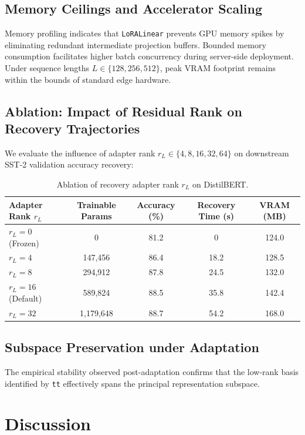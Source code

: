 \subsection{Memory Ceilings and Accelerator Scaling}
Memory profiling indicates that \texttt{LoRALinear} prevents GPU memory spikes by eliminating redundant intermediate projection buffers. Bounded memory consumption facilitates higher batch concurrency during server-side deployment. Under sequence lengths $L \in \{128, 256, 512\}$, peak VRAM footprint remains within the bounds of standard edge hardware.

\subsection{Ablation: Impact of Residual Rank on Recovery Trajectories}
We evaluate the influence of adapter rank $r_L \in \{4, 8, 16, 32, 64\}$ on downstream SST-2 validation accuracy recovery:
\begin{table}[H]
\centering
\small
\begin{tabular}{lcccc}
\toprule
\textbf{Adapter Rank $r_L$} & \textbf{Trainable Params} & \textbf{Accuracy (\%)} & \textbf{Recovery Time (s)} & \textbf{VRAM (MB)} \\
\midrule
$r_L = 0$ (Frozen) & 0 & 81.2 & 0 & 124.0 \\
$r_L = 4$ & 147,456 & 86.4 & 18.2 & 128.5 \\
$r_L = 8$ & 294,912 & 87.8 & 24.5 & 132.0 \\
$r_L = 16$ (Default) & 589,824 & 88.5 & 35.8 & 142.4 \\
$r_L = 32$ & 1,179,648 & 88.7 & 54.2 & 168.0 \\
\bottomrule
\end{tabular}
\caption{Ablation of recovery adapter rank $r_L$ on DistilBERT.}
\label{tab:ablation_adapter_rank}
\end{table}

\subsection{Subspace Preservation under Adaptation}
The empirical stability observed post-adaptation confirms that the low-rank basis identified by \texttt{tt} effectively spans the principal representation subspace.


\section{Discussion}

